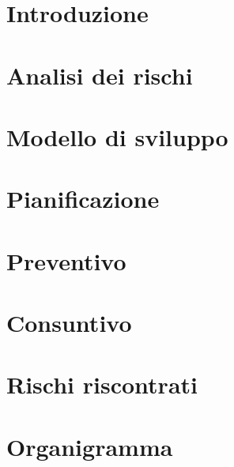 \documentclass{article}
\begin{document}


\section{Introduzione}
\label{sec:introduzione}


\newpage
\section{Analisi dei rischi}
\label{sec:rischi}


\newpage
\section{Modello di sviluppo}
\label{sec:sviluppo}


\newpage
\section{Pianificazione}
\label{sec:pianif}


\newpage
\section{Preventivo}
\label{sec:prev}


\newpage
\section{Consuntivo}
\label{sec:cons}


\appendix
\newpage
\section{Rischi riscontrati}
\label{sec:rischi_riscontrati}


\newpage
\section{Organigramma}
\label{sec:org}

\end{document}
